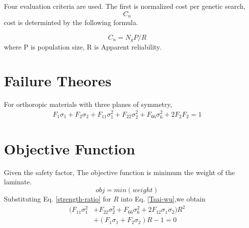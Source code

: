 \documentclass[smallextended]{svjour3}       %
\begin{document}
Four evaluation criteria are used. 
The first is normalized cost per genetic search, $$C_{n}$$
cost is determinted by the following formula.

$$C_{n} = N_{g}P/R$$
where P is population size, R is Apparent reliability.


\section{Failure Theores}

For orthoropic materials with three planes of symmetry, 
\begin{equation}\label{Tsai-wu}
	\begin{split}
		F_1\sigma_1+F_2\sigma_2+F_{11}\sigma_1^2+F_{22}\sigma_2^2+F_{66}\sigma_6^2+2F_2F_2=1
    \end{split}
\end{equation}

\section{Objective Function}

Given the safety factor, The objective function is minimum the weight of the laminate.
\begin{equation*}\label{strength-ratio}
	obj=min(weight) 
\end{equation*}
Substituting Eq. \ref{strength-ratio} for $R$ into Eq. \ref{Tsai-wu},we obtain
\begin{equation*}
	\begin{split}
		(F_{11}\sigma_1^2&+F_{22}\sigma_2^2+F_{66}\sigma_6^2+2F_{12}\sigma_1\sigma_2)R^2 \\
						 &+(F_1\sigma_1+F_2\sigma_2)R-1=0
	\end{split}
\end{equation*}
\end{document}
